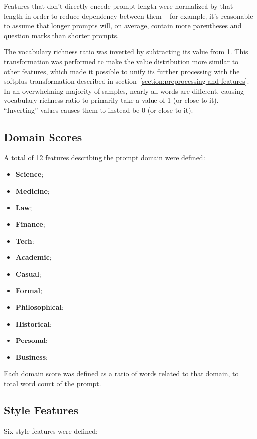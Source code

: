 \documentclass[a4paper,11pt,twoside]{report}
\theoremstyle{definition}
\begin{document}
Features that don't directly encode prompt length were normalized by that length in order to reduce dependency between them -- for example, it's reasonable to assume that longer prompts will, on average, contain more parentheses and question marks than shorter prompts.

The vocabulary richness ratio was inverted by subtracting its value from 1. This transformation was performed to make the value distribution more similar to other features, which made it possible to unify its further processing with the softplus transformation described in section~\ref{section:preprocessing-and-features}. In an overwhelming majority of samples, nearly all words are different, causing vocabulary richness ratio to primarily take a value of 1 (or close to it). ``Inverting'' values causes them to instead be 0 (or close to it).

\subsection{Domain Scores}

A total of 12 features describing the prompt domain were defined:

\begin{itemize}
    \item \textbf{Science};
    \item \textbf{Medicine};
    \item \textbf{Law};
    \item \textbf{Finance};
    \item \textbf{Tech};
    \item \textbf{Academic};
    \item \textbf{Casual};
    \item \textbf{Formal};
    \item \textbf{Philosophical};
    \item \textbf{Historical};
    \item \textbf{Personal};
    \item \textbf{Business};
\end{itemize}

Each domain score was defined as a ratio of words related to that domain, to total word count of the prompt.

\subsection{Style Features}

Six style features were defined:
\end{document}
